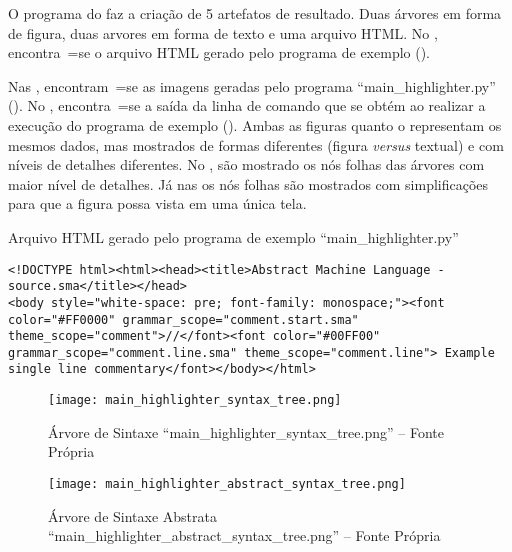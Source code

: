O programa do  faz a criação de 5 artefatos de resultado.
Duas árvores em forma de figura,
duas arvores em forma de texto e
uma arquivo HTML.
No ,
encontra~=se o arquivo HTML gerado pelo programa de exemplo ().

Nas ,
encontram~=se as imagens geradas pelo programa ``main\_highlighter.py'' ().
No ,
encontra~=se a saída da linha de comando que se obtém ao realizar a execução do programa de exemplo ().
Ambas as figuras  quanto o  representam os mesmos dados,
mas mostrados de formas diferentes (figura \textit{versus} textual) e
com níveis de detalhes diferentes.
No ,
são mostrado os nós folhas das árvores com maior nível de detalhes.
Já nas  os nós folhas são mostrados com simplificações para que a figura possa vista em uma única tela.
\begin{code}
\caption{Arquivo HTML gerado pelo programa de exemplo ``main\_highlighter.py''}
\label{MainHighlighterHtml}
\begin{verbatim}
<!DOCTYPE html><html><head><title>Abstract Machine Language - source.sma</title></head>
<body style="white-space: pre; font-family: monospace;"><font color="#FF0000" grammar_scope="comment.start.sma" theme_scope="comment">//</font><font color="#00FF00" grammar_scope="comment.line.sma" theme_scope="comment.line"> Example single line commentary</font></body></html>
\end{verbatim}
\end{code}

\begin{figure}[h]
\centering
\texttt{[image: main\_highlighter\_syntax\_tree.png]}
\caption[Árvore de Sintaxe ``main\_highlighter\_syntax\_tree.png'']
{Árvore de Sintaxe ``main\_highlighter\_syntax\_tree.png'' -- Fonte Própria}
\label{MainHighlighterSyntaxTree}
\end{figure}

\begin{figure}[h]
\centering
\texttt{[image: main\_highlighter\_abstract\_syntax\_tree.png]}
\caption[Árvore de Sintaxe Abstrata ``main\_highlighter\_abstract\_syntax\_tree.png'']
{Árvore de Sintaxe Abstrata ``main\_highlighter\_abstract\_syntax\_tree.png'' -- Fonte Própria}
\label{MainHighlighterAbstractSyntaxTree}
\end{figure}

